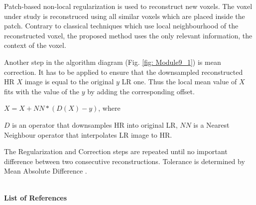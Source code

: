 Patch-based non-local regularization is used to reconstruct new voxels. The voxel under study is reconstruced using all similar voxels which are placed inside the patch. Contrary to classical techniques which use local neighbourhood of the reconstructed voxel, the proposed method uses the only relevant information, the context of the voxel.

Another step in the algorithm diagram (Fig. \ref{fig: Module9_1}) is mean correction. It has to be applied to ensure that the downsampled reconstructed HR $X$ image is equal to the original $y$ LR one. Thus the local mean value of $X$ fits with the value of the $y$ by adding the corresponding offset.

\centerline{$X=X+NN*(D(X)-y)$, where}

$D$ is an operator that downsamples HR into original LR,
\newline $NN$ is a Nearest Neighbour operator that interpolates LR image to HR.

The Regularization and Correction steps are repeated until no important difference between two consecutive reconstructions. Tolerance is determined by Mean Absolute Difference .

\hfill{}\\
\textbf{List of References}\\
\cite{9art1}
\cite{9art2}
